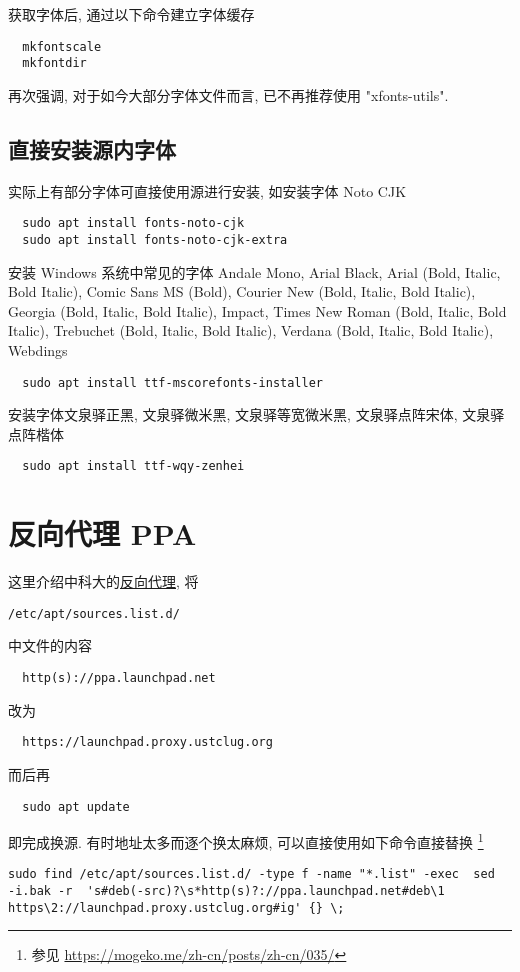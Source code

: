 获取字体后,
通过以下命令建立字体缓存
\begin{lstlisting}
  mkfontscale
  mkfontdir
\end{lstlisting}
再次强调,
对于如今大部分字体文件而言,
已不再推荐使用 "xfonts-utils".

\subsection{直接安装源内字体}

实际上有部分字体可直接使用源进行安装,
如安装字体 Noto CJK
\begin{lstlisting}
  sudo apt install fonts-noto-cjk
  sudo apt install fonts-noto-cjk-extra
\end{lstlisting}
安装 Windows 系统中常见的字体 Andale Mono,
Arial Black,
Arial (Bold, Italic, Bold Italic),
Comic Sans MS (Bold),
Courier New (Bold, Italic, Bold Italic),
Georgia (Bold, Italic, Bold Italic),
Impact,
Times New Roman (Bold, Italic, Bold Italic),
Trebuchet (Bold, Italic, Bold Italic),
Verdana (Bold, Italic, Bold Italic),
Webdings
\begin{lstlisting}
  sudo apt install ttf-mscorefonts-installer
\end{lstlisting}
安装字体文泉驿正黑,
文泉驿微米黑,
文泉驿等宽微米黑,
文泉驿点阵宋体,
文泉驿点阵楷体
\begin{lstlisting}
  sudo apt install ttf-wqy-zenhei
\end{lstlisting}

\section{反向代理 PPA}\label{sec:addition:proxy}

这里介绍中科大的\href{https://mirrors.ustc.edu.cn/}{反向代理},
将
\begin{lstlisting}[deletekeywords = apt]
  /etc/apt/sources.list.d/
\end{lstlisting}
中文件的内容
\begin{lstlisting}
  http(s)://ppa.launchpad.net
\end{lstlisting}
改为
\begin{lstlisting}
  https://launchpad.proxy.ustclug.org
\end{lstlisting}
而后再
\begin{lstlisting}
  sudo apt update
\end{lstlisting}
即完成换源.
有时地址太多而逐个换太麻烦,
可以直接使用如下命令直接替换%
\footnote{参见 \url{https://mogeko.me/zh-cn/posts/zh-cn/035/}}
\begin{lstlisting}[deletekeywords = apt]
  sudo find /etc/apt/sources.list.d/ -type f -name "*.list" -exec  sed  -i.bak -r  's#deb(-src)?\s*http(s)?://ppa.launchpad.net#deb\1 https\2://launchpad.proxy.ustclug.org#ig' {} \;
\end{lstlisting}

